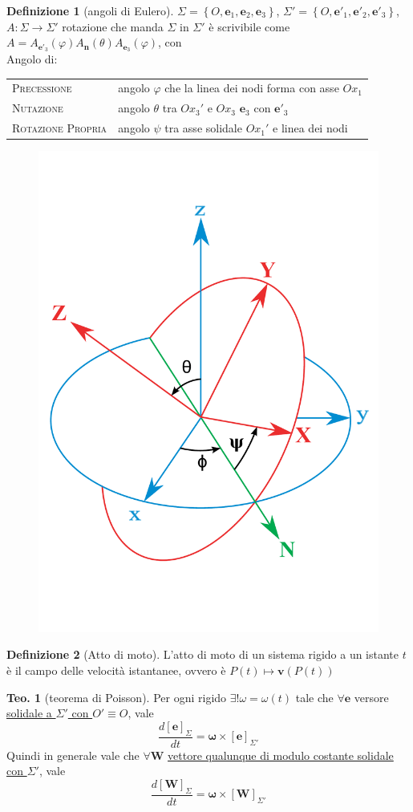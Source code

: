 \documentclass[a4paper,10pt]{article}
\theoremstyle{definition}
\newcommand{\noun}[1]{\textsc{#1}}
\providecommand{\tabularnewline}{\\}
\newcommand{\bv}{\boldsymbol} %
\theoremstyle{indentdefinition}
\newtheorem{defn}{Definizione}[section]
\theoremstyle{indenttheorem}
\newtheorem{thm}{Teo.}
\theoremstyle{myremark}
\theoremstyle{indentgeneral}
\newenvironment{myboxed} 
{\noindent\begin{lrbox}{\mybox}\begin{minipage}{\textwidth}}
{\end{minipage}\end{lrbox}\fbox{\usebox{\mybox}}}
\begin{document}
\begin{defn}[angoli di Eulero]
\label{def:angoli-Eulero}$\Sigma=\left\{ O,\boldsymbol{e}_{1},\boldsymbol{e}_{2},\boldsymbol{e}_{3}\right\} $,
$\Sigma'=\left\{ O,\boldsymbol{e}'_{1},\boldsymbol{e}'_{2},\boldsymbol{e}'_{3}\right\} $,
$A\colon\Sigma\rightarrow\Sigma'$ rotazione che manda $\Sigma$ in
$\Sigma'$ è scrivibile come $A=A_{\boldsymbol{e}'_{3}}\left(\varphi\right)A_{\boldsymbol{n}}\left(\theta\right)A_{\boldsymbol{e}_{3}}\left(\varphi\right)$,
con\\
Angolo di:\\
\begin{tabular}{ll}
\noun{Precessione} & angolo $\varphi$ che la linea dei nodi forma con asse $Ox_1$ \tabularnewline
\noun{Nutazione} & angolo $\theta$ tra $Ox_3'$ e $Ox_3$
$\boldsymbol{e}_{3}$ con $\boldsymbol{e}'_{3}$\tabularnewline
\noun{Rotazione Propria} & angolo $\psi$ tra asse solidale $Ox_1'$ e linea dei  nodi
\tabularnewline
\end{tabular}
\end{defn}

\begin{figure}[h]
    \centering
    \includegraphics[width=0.25\linewidth]{Eulerangles2.pdf}
    
    \label{fig:enter-label}
\end{figure}

\begin{defn}[Atto di moto]
    L'atto di moto di un sistema rigido a un istante $t$ è il campo delle velocità istantanee, ovvero è $P(t)\mapsto \bv{v}(P(t))$
\end{defn}

\begin{myboxed}
\begin{thm}[teorema di Poisson]
\label{thm:teorema-Poisson}Per ogni 
rigido $\exists!\omega=\omega\left(t\right)$ tale che $\forall\boldsymbol{e}$
versore \underline{solidale a $\Sigma'$ con $O'\equiv O$}, vale $$\frac{d[\boldsymbol{e}]_{\Sigma}}{dt}=\boldsymbol{\omega}\times[\boldsymbol{e}]_{\Sigma'}$$
Quindi in generale vale che  $\forall\boldsymbol{W}$
\underline{vettore qualunque di modulo costante solidale con $\Sigma'$}, vale $$\frac{d[\boldsymbol{W}]_{\Sigma}}{dt}=\boldsymbol{\omega}\times[\boldsymbol{W}]_{\Sigma'}$$
\end{thm}
\end{myboxed}
\end{document}
